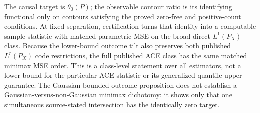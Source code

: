 The causal target is \(\theta_0(P)\); the observable contour ratio is its identifying functional only on contours satisfying the proved zero-free and positive-count conditions. At fixed separation, certification turns that identity into a computable sample statistic with matched parametric MSE on the broad direct-\(L^1(P_X)\) class. Because the lower-bound outcome tilt also preserves both published \(L^r(P_X)\) code restrictions, the full published ACE class has the same matched minimax MSE order. This is a class-level statement over all estimators, not a lower bound for the particular ACE statistic or its generalized-quantile upper guarantee. The Gaussian bounded-outcome proposition does not establish a Gaussian-versus-non-Gaussian minimax dichotomy: it shows only that one simultaneous source-stated intersection has the identically zero target.